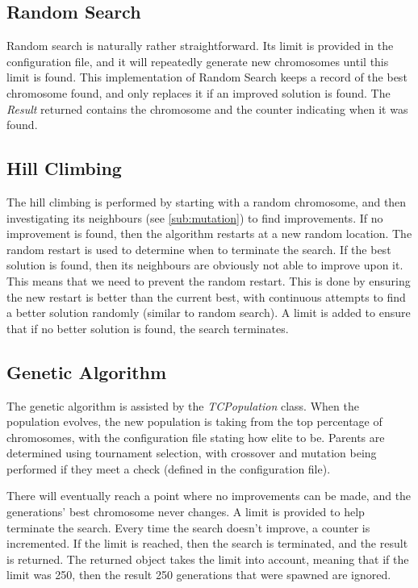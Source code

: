 \documentclass[11pt, a4paper]{article}
\begin{document}
\subsection{Random Search}
\label{sub:random_search}
Random search is naturally rather straightforward. Its limit is provided in the
configuration file, and it will repeatedly generate new chromosomes until this
limit is found. This implementation of Random Search keeps a record of the best
chromosome found, and only replaces it if an improved solution is found. The
\emph{Result} returned contains the chromosome and the counter indicating when
it was found.

\subsection{Hill Climbing}
\label{sub:hill_climbing}
The hill climbing is performed by starting with a random chromosome, and then
investigating its neighbours (see \ref{sub:mutation}) to find improvements. If
no improvement is found, then the algorithm restarts at a new random location.
The random restart is used to determine when to terminate the search. If the
best solution is found, then its neighbours are obviously not able to improve
upon it. This means that we need to prevent the random restart. This is done by
ensuring the new restart is better than the current best, with continuous
attempts to find a better solution randomly (similar to random search). A limit
is added to ensure that if no better solution is found, the search terminates.

\subsection{Genetic Algorithm}
\label{sub:genetic_algorithm}
The genetic algorithm is assisted by the \emph{TCPopulation} class. When the
population evolves, the new population is taking from the top percentage of
chromosomes, with the configuration file stating how elite to be. Parents are
determined using tournament selection, with crossover and mutation being
performed if they meet a check (defined in the configuration file).

There will eventually reach a point where no improvements can be made, and the
generations' best chromosome never changes. A limit is provided to help
terminate the search. Every time the search doesn't improve, a counter is
incremented. If the limit is reached, then the search is terminated, and the
result is returned. The returned object takes the limit into account, meaning
that if the limit was 250, then the result 250 generations that were spawned are
ignored.
\end{document}
